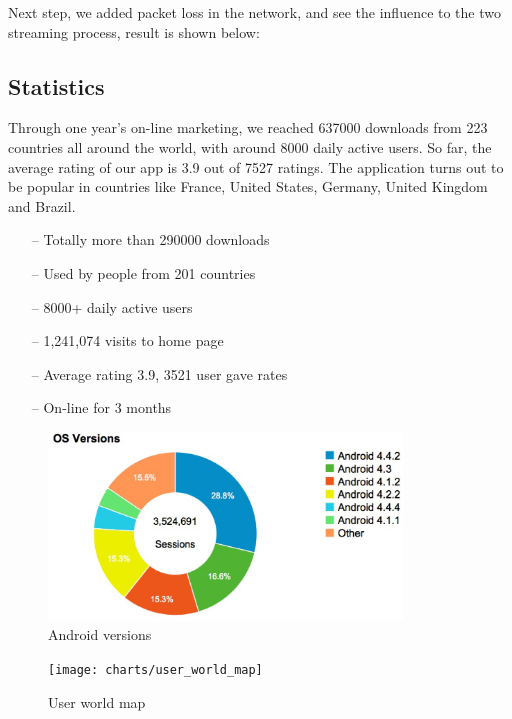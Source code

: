 Next step, we added packet loss in the network, and see the influence to the two
streaming process, result is shown below:

\subsection{Statistics}
Through one year's on-line marketing, we reached 637000 downloads from 223
countries all around the world, with around 8000 daily active users. So far, the
average rating of our app is 3.9 out of 7527 ratings. The application turns out
to be popular in countries like France, United States, Germany, United Kingdom
and Brazil.

\begin{itemize}
\item[--]Totally more than 290000 downloads
\item[--]Used by people from 201 countries
\item[--]8000+ daily active users
\item[--]1,241,074 visits to home page
\item[--]Average rating 3.9, 3521 user gave rates
\item[--]On-line for 3 months
\end{itemize}
\begin{figure}[htb]
\centering \includegraphics[height=5cm]{charts/android_versions}
\caption{Android versions \label{chart6}}
\end{figure}

\begin{figure}[htb]
\centering \texttt{[image: charts/user\_world\_map]}
\caption{User world map \label{chart7}}
\end{figure}

\begin{table}[htb]
\caption{Receiver type statistic \label{Table8}}
\begin{center}
\end{center}
\end{table}

